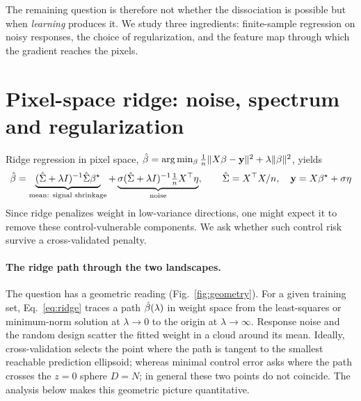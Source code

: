 The remaining question is therefore not whether the dissociation is possible but when \emph{learning} produces it. We study three ingredients: finite-sample regression on noisy responses, the choice of regularization, and the feature map through which the gradient reaches the pixels. %

\vspace{-10pt}
\section{Pixel-space ridge: noise, spectrum and regularization}
\label{sec:pixel}

Ridge regression in pixel space, $\hat{\beta}=\arg\min_\beta\frac1n\|X\beta-\mathbf y\|^2+\lambda\|\beta\|^2$, yields
\begin{equation}
\hat{\beta}=\underbrace{(\hat\Sigma+\lambda I)^{-1}\hat\Sigma{\beta^{\star}}}_{\text{mean: signal shrinkage}}
+\underbrace{\sigma(\hat\Sigma+\lambda I)^{-1}\tfrac1nX^\top\eta}_{\text{noise}},
\qquad \hat\Sigma=X^\top X/n,
\quad
\mathbf y=X{\beta^{\star}}+\sigma \eta
\label{eq:ridge}
\end{equation}
Since ridge penalizes weight in low-variance directions, one might expect it to remove these control-vulnerable components. We ask whether such control risk survive a cross-validated penalty.

\paragraph{The ridge path through the two landscapes.}
The question has a geometric reading (Fig.~\ref{fig:geometry}). For a given training set, Eq.~\ref{eq:ridge} traces a path $\hat{\beta}(\lambda)$ in weight space from the least-squares or minimum-norm solution at $\lambda\to0$ to the origin at $\lambda\to\infty$. Response noise and the random design scatter the fitted weight in a cloud around its mean. Ideally, cross-validation selects the point where the path is tangent to the smallest reachable prediction ellipsoid; whereas minimal control error asks where the path crosses the $z=0$ sphere $D=N$; in general these two points do not coincide. The analysis below makes this geometric picture quantitative.


